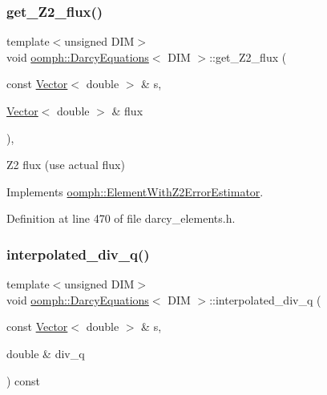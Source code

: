 \mbox{\label{classoomph_1_1DarcyEquations_a5c077b66056e1d66c0bd8f0430875bf8}} 
\subsubsection{\texorpdfstring{get\+\_\+\+Z2\+\_\+flux()}{get\_Z2\_flux()}}
{\footnotesize\ttfamily template$<$unsigned D\+IM$>$ \\
void \hyperlink{classoomph_1_1DarcyEquations}{oomph\+::\+Darcy\+Equations}$<$ D\+IM $>$\+::get\+\_\+\+Z2\+\_\+flux (\begin{DoxyParamCaption}\item[{const \hyperlink{classoomph_1_1Vector}{Vector}$<$ double $>$ \&}]{s,  }\item[{\hyperlink{classoomph_1_1Vector}{Vector}$<$ double $>$ \&}]{flux }\end{DoxyParamCaption})\hspace{0.3cm}{\ttfamily [inline]}, {\ttfamily [virtual]}}



Z2 flux (use actual flux) 



Implements \hyperlink{classoomph_1_1ElementWithZ2ErrorEstimator_a5688ff5f546d81771cabad82ca5a7556}{oomph\+::\+Element\+With\+Z2\+Error\+Estimator}.



Definition at line 470 of file darcy\+\_\+elements.\+h.

\mbox{\label{classoomph_1_1DarcyEquations_ab9f255825c7bc27d042b936757960f7a}} 
\subsubsection{\texorpdfstring{interpolated\+\_\+div\+\_\+q()}{interpolated\_div\_q()}\hspace{0.1cm}{\footnotesize\ttfamily [1/2]}}
{\footnotesize\ttfamily template$<$unsigned D\+IM$>$ \\
void \hyperlink{classoomph_1_1DarcyEquations}{oomph\+::\+Darcy\+Equations}$<$ D\+IM $>$\+::interpolated\+\_\+div\+\_\+q (\begin{DoxyParamCaption}\item[{const \hyperlink{classoomph_1_1Vector}{Vector}$<$ double $>$ \&}]{s,  }\item[{double \&}]{div\+\_\+q }\end{DoxyParamCaption}) const\hspace{0.3cm}{\ttfamily [inline]}}



